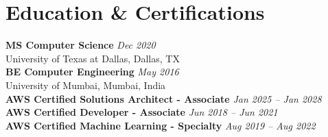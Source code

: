 \documentclass[a4paper,10pt]{article}
\begin{document}
\vspace{0.1cm}


\section*{Education \& Certifications}
\noindent \textbf{MS Computer Science} \hfill \textit{Dec 2020} \\
University of Texas at Dallas, Dallas, TX \\
\textbf{BE Computer Engineering} \hfill \textit{May 2016} \\
University of Mumbai, Mumbai, India \\

\noindent \textbf{AWS Certified Solutions Architect - Associate} \hfill \textit{Jan 2025 -- Jan 2028} \\
\textbf{AWS Certified Developer - Associate} \hfill \textit{Jun 2018 -- Jun 2021} \\
\textbf{AWS Certified Machine Learning - Specialty} \hfill \textit{Aug 2019 -- Aug 2022}
\end{document}
